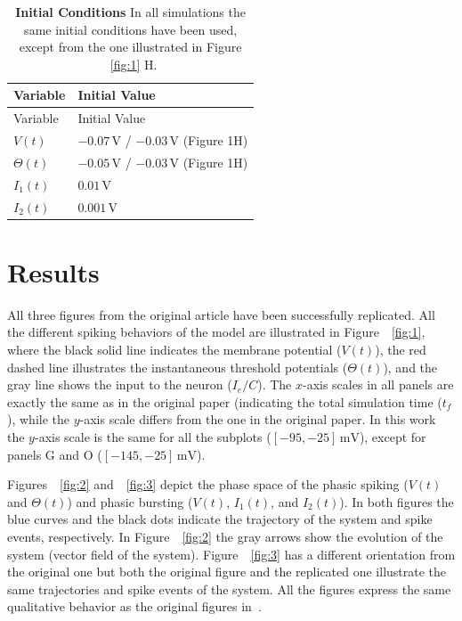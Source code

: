 \documentclass[10pt,a4paper,onecolumn]{article}
\begin{document}
\hypertarget{tbl:6}{}
\begin{longtable}[]{@{}ll@{}}
\caption{\label{tbl:6}\textbf{Initial Conditions} In all simulations the
same initial conditions have been used, except from the one illustrated
in Figure ~\ref{fig:1} H. }\tabularnewline
\toprule
Variable & Initial Value\tabularnewline
\midrule
\endfirsthead
\toprule
Variable & Initial Value\tabularnewline
\midrule
\endhead
\(V(t)\) & \(-0.07\, \mathrm{V}\) / \(-0.03\, \mathrm{V}\) (Figure
1H)\tabularnewline
\(\Theta(t)\) & \(-0.05\, \mathrm{V}\) / \(-0.03\, \mathrm{V}\) (Figure
1H)\tabularnewline
\(I_1(t)\) & \(0.01\, \mathrm{V}\)\tabularnewline
\(I_2(t)\) & \(0.001\, \mathrm{V}\)\tabularnewline
\bottomrule
\end{longtable}

\section{Results}\label{results}

All three figures from the original article have been successfully
replicated. All the different spiking behaviors of the model are
illustrated in Figure~~\ref{fig:1}, where the black solid line indicates
the membrane potential (\(V(t)\)), the red dashed line illustrates the
instantaneous threshold potentials (\(\Theta(t)\)), and the gray line
shows the input to the neuron (\(I_e/C\)). The \(x\)-axis scales in all
panels are exactly the same as in the original paper (indicating the
total simulation time (\(t_f\)), while the \(y\)-axis scale differs from
the one in the original paper. In this work the \(y\)-axis scale is the
same for all the subplots (\([-95, -25]\, {\mathrm{mV}}\)), except for
panels G and O (\([-145, -25]\, {\mathrm{mV}}\)).

Figures~~\ref{fig:2} and~~\ref{fig:3} depict the phase space of the
phasic spiking (\(V(t)\) and \(\Theta(t)\)) and phasic bursting
(\(V(t)\), \(I_1(t)\), and \(I_2(t)\)). In both figures the blue curves
and the black dots indicate the trajectory of the system and spike
events, respectively. In Figure~~\ref{fig:2} the gray arrows show the
evolution of the system (vector field of the system).
Figure~~\ref{fig:3} has a different orientation from the original one
but both the original figure and the replicated one illustrate the same
trajectories and spike events of the system. All the figures express the
same qualitative behavior as the original figures
in~\autocite{mihalas:2009}.
\end{document}
